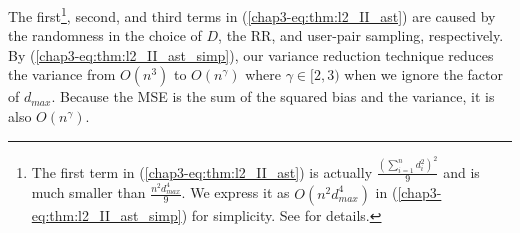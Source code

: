 %

The first\footnote{The first term in (\ref{chap3-eq:thm:l2_II_ast}) is actually $\frac{(\sum_{i=1}^n d_i^2)^2}{9}$ and is much smaller than $\frac{n^2 d_{max}^4}{9}$. 
We express it as $O(n^2 d_{max}^4)$ in (\ref{chap3-eq:thm:l2_II_ast_simp}) for simplicity. 
See  for details.}, second, and third terms in (\ref{chap3-eq:thm:l2_II_ast}) are caused by the randomness in the choice of $D$, the RR, and user-pair sampling, respectively. 
By (\ref{chap3-eq:thm:l2_II_ast_simp}), our variance reduction technique reduces the variance from $O(n^3)$ to $O(n^\gamma)$ where $\gamma\in[2,3)$ when we ignore the factor of $d_{max}$.
Because the MSE is the sum of the squared bias and the variance, it is also $O(n^\gamma)$.

